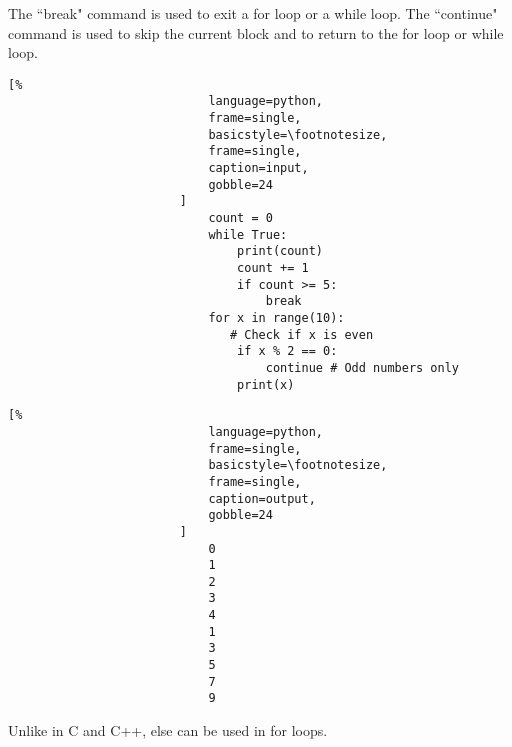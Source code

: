 \documentclass[crop=false,class=book,oneside]{standalone}
\begin{document}
                    The ``break" command is used to exit a for loop or a
                    while loop. The ``continue" command is used to skip
                    the current block and to return to the for loop or
                    while loop.
                    \newpage
                    \begin{minipage}[t]{.48\textwidth}
                        \centering
                        \begin{lstlisting}[%
                            language=python,
                            frame=single,
                            basicstyle=\footnotesize,
                            frame=single,
                            caption=input,
                            gobble=24
                        ]
                            count = 0
                            while True:
                                print(count)
                                count += 1
                                if count >= 5:
                                    break
                            for x in range(10):
                               # Check if x is even
                                if x % 2 == 0:
                                    continue # Odd numbers only
                                print(x)
                        \end{lstlisting}
                    \end{minipage}\hfill
                    \begin{minipage}[t]{.48\textwidth}
                        \centering
                        \begin{lstlisting}[%
                            language=python,
                            frame=single,
                            basicstyle=\footnotesize,
                            frame=single,
                            caption=output,
                            gobble=24
                        ]
                            0
                            1
                            2
                            3
                            4
                            1
                            3
                            5
                            7
                            9
                        \end{lstlisting}
                    \end{minipage}
                    Unlike in C and C++, else can be used in for
                    loops.\newline
\end{document}
